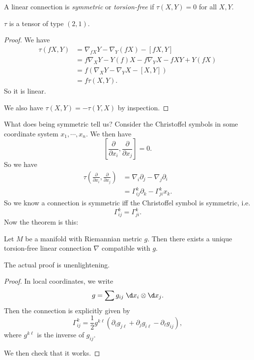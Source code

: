 \documentclass[a4paper]{article}
\begin{document}
\begin{defi}
  A linear connection is \emph{symmetric} or \emph{torsion-free} if $\tau(X, Y) = 0$ for all $X, Y$.
\end{defi}

\begin{prop}
  $\tau$ is a tensor of type $(2, 1)$.
\end{prop}

\begin{proof}
  We have
  \begin{align*}
    \tau(fX, Y) &= \nabla_{fX}Y - \nabla_Y(fX) - [fX, Y]\\
    &= f\nabla_X Y - Y(f) X - f \nabla_Y X - fXY + Y(f X)\\
    &= f(\nabla_X Y - \nabla_Y X - [X, Y])\\
    &= f \tau(X, Y).
  \end{align*}
  So it is linear.

  We also have $\tau(X, Y) = - \tau(Y, X)$ by inspection.
\end{proof}

What does being symmetric tell us? Consider the Christoffel symbols in some coordinate system $x_1, \cdots, x_n$. We then have
\[
  \left[\frac{\partial}{\partial x_i}, \frac{\partial}{\partial x_j}\right] = 0.
\]
So we have
\begin{align*}
  \tau\left(\frac{\partial}{\partial x_i}, \frac{\partial}{\partial x_j}\right) &= \nabla_i \partial_j - \nabla_j \partial_i\\\
  &= \Gamma_{ij}^k \partial_k - \Gamma^k_{ji} x_k.
\end{align*}
So we know a connection is symmetric iff the Christoffel symbol is symmetric, i.e.
\[
  \Gamma_{ij}^k = \Gamma_{ji}^k.
\]
Now the theorem is this:
\begin{thm}
  Let $M$ be a manifold with Riemannian metric $g$. Then there exists a unique torsion-free linear connection $\nabla$ compatible with $g$.
\end{thm}

The actual proof is unenlightening.

\begin{proof}
  In local coordinates, we write
  \[
    g = \sum g_{ij} \;\d x_i \otimes \d x_j.
  \]
  Then the connection is explicitly given by
  \[
    \Gamma^k_{ij} = \frac{1}{2} g^{k\ell} (\partial_i g_{j\ell} + \partial_j g_{i\ell} - \partial_\ell g_{ij}),
  \]
  where $g^{k\ell}$ is the inverse of $g_{ij}$.

  We then check that it works.
\end{proof}
\end{document}
